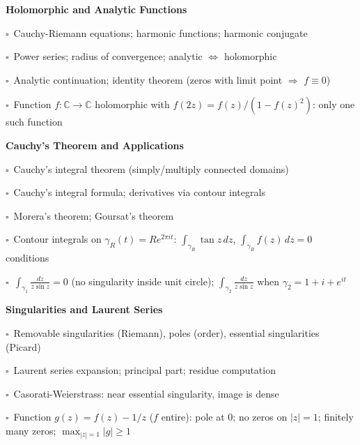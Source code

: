 \documentclass[11pt,a4paper]{article}
\newcommand{\chk}{\textcolor{rulegray}{$\square$}\ }
\begin{document}
\begin{subtopics}

  \item \textbf{Holomorphic and Analytic Functions}
  \begin{subtopics}
    \item \chk Cauchy-Riemann equations; harmonic functions; harmonic conjugate
    \item \chk Power series; radius of convergence; analytic $\Leftrightarrow$ holomorphic
    \item \chk Analytic continuation; identity theorem (zeros with limit point $\Rightarrow$ $f\equiv 0$)
    \item \chk Function $f:\mathbb{C}\to\mathbb{C}$ holomorphic with $f(2z)=f(z)/(1-f(z)^2)$: only one such function
  \end{subtopics}

  \item \textbf{Cauchy's Theorem and Applications}
  \begin{subtopics}
    \item \chk Cauchy's integral theorem (simply/multiply connected domains)
    \item \chk Cauchy's integral formula; derivatives via contour integrals
    \item \chk Morera's theorem; Goursat's theorem
    \item \chk Contour integrals on $\gamma_R(t)=Re^{2\pi it}$: $\int_{\gamma_R}\tan z\,dz$, $\int_{\gamma_R}f(z)\,dz=0$ conditions
    \item \chk $\int_{\gamma_1} \frac{dz}{z\sin z}=0$ (no singularity inside unit circle); $\int_{\gamma_2} \frac{dz}{z\sin z}$ when $\gamma_2=1+i+e^{it}$
  \end{subtopics}

  \item \textbf{Singularities and Laurent Series}
  \begin{subtopics}
    \item \chk Removable singularities (Riemann), poles (order), essential singularities (Picard)
    \item \chk Laurent series expansion; principal part; residue computation
    \item \chk Casorati-Weierstrass: near essential singularity, image is dense
    \item \chk Function $g(z)=f(z)-1/z$ ($f$ entire): pole at 0; no zeros on $|z|=1$; finitely many zeros; $\max_{|z|=1}|g|\ge 1$
  \end{subtopics}


\end{subtopics}
\end{document}
